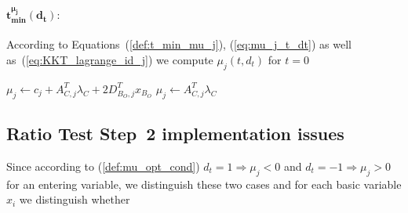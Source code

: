 \documentclass[a4paper]{article}
\begin{document}
\paragraph{$\mathbf{t_{min}^{\mu_{j}}(d_{t}):}$}
According to Equations~(\ref{def:t_min_mu_j}), (\ref{eq:mu_j_t_dt}) as well
as~(\ref{eq:KKT_lagrange_id_j}) we compute $\mu_{j}(t, d_{t})$ for $t=0$ 
\begin{algorithmic}
    \State $\mu_{j} \gets c_{j}+A_{C,j}^{T}\lambda_{C}
        +2D_{B_{O},j}^{T}x_{B_{O}}$
\Else
    \State $\mu_{j} \gets A_{C,j}^{T}\lambda_{C}$
\EndIf 
\EndFunction
\end{algorithmic}

\subsection{Ratio Test Step~2 implementation issues}
Since according to (\ref{def:mu_opt_cond}) $d_{t}=1 \Rightarrow \mu_{j}<0$ and $d_{t}=-1 \Rightarrow \mu_{j}>0$ for an entering variable, we distinguish these two cases and for each basic variable $x_{i}$ we distinguish whether  
\end{document}
